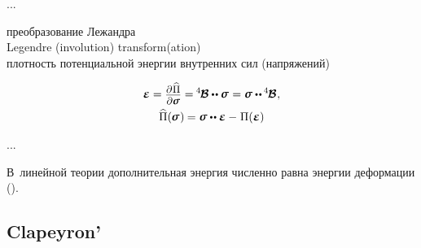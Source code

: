 \begin{otherlanguage}{russian}
...

\noindent
преобразование Лежандра\\
Legendre (involution) transform(ation)\\
плотность потенциальной энергии внутренних сил (напряжений)\\

\nopagebreak\vspace{-0.1em}\begin{equation}\label{legendretransformforlinearelasticenergy}
\begin{gathered}
\infinitesimaldeformation = \scalebox{0.9}{$\displaystyle\frac{\raisemath{-0.2em}{\partial\hspace{.1ex} \widehat{\potential}}}{\raisemath{.04em}{\partial \linearstress}}$} = \hspace{-0.12ex} \pliabilitytensor \dotdotp \linearstress \hspace{.1ex} = \linearstress \dotdotp \hspace{-0.1ex} \pliabilitytensor
\hspace{.1ex} ,
\\
%
\widehat{\potential}(\hspace{-0.1ex}\linearstress\hspace{.12ex}) \hspace{-0.1ex}
= \linearstress \dotdotp \infinitesimaldeformation
- \hspace{.1ex} \potential(\infinitesimaldeformation)
\end{gathered}
\end{equation}

...

В~линейной теории дополнительная энергия численно равна энергии деформации ().

\end{otherlanguage}



\label{para:theoremsofstatics}

\subsection*{Clapeyron’}

